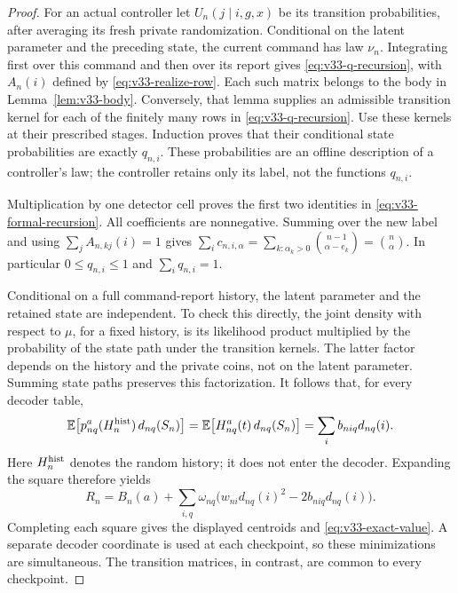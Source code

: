 \begin{proof}
For an actual controller let $U_n(j\mid i,g,x)$ be its transition
probabilities, after averaging its fresh private randomization.
Conditional on the latent parameter and the preceding state, the
current command has law $\nu_n$. Integrating first over this command
and then over its report gives \eqref{eq:v33-q-recursion}, with
$A_n(i)$ defined by \eqref{eq:v33-realize-row}. Each such matrix
belongs to the body in Lemma~\ref{lem:v33-body}.
Conversely, that lemma supplies an admissible transition kernel for
each of the finitely many rows in \eqref{eq:v33-q-recursion}. Use
these kernels at their prescribed stages. Induction proves that their
conditional state probabilities are exactly $q_{n,i}$. These
probabilities are an offline description of a controller's law; the
controller retains only its label, not the functions $q_{n,i}$.

Multiplication by one detector cell proves the first two identities
in \eqref{eq:v33-formal-recursion}. All coefficients are nonnegative.
Summing over the new label and using $\sum_j A_{n,kj}(i)=1$ gives
$\sum_i c_{n,i,\alpha}=\sum_{k:\alpha_k>0}\binom{n-1}{\alpha-e_k}
=\binom n\alpha$. In particular $0\le q_{n,i}\le1$ and
$\sum_i q_{n,i}=1$.

Conditional on a full command-report history, the latent parameter
and the retained state are independent. To check this directly, the
joint density with respect to $\mu$, for a fixed history, is its
likelihood product multiplied by the probability of the state path
under the transition kernels. The latter factor depends on the
history and the private coins, not on the latent parameter. Summing
state paths preserves this factorization. It follows that, for every
decoder table,
\[
 \mathbb E\bigl[p^a_{nq}(H_n^{\rm hist})\,d_{nq}(S_n)\bigr]
       =\mathbb E\bigl[H^a_{nq}(t)\,d_{nq}(S_n)\bigr]
       =\sum_i b_{niq}d_{nq}(i).
\]
Here $H_n^{\rm hist}$ denotes the random history;
it does not enter the decoder. Expanding the square therefore yields
\begin{equation}\label{eq:v33-fixed-decoder}
 R_n=B_n(a)+\sum_{i,q}\omega_{nq}
          \bigl(w_{ni}d_{nq}(i)^2-2b_{niq}d_{nq}(i)\bigr).
\end{equation}
Completing each square gives the displayed centroids and
\eqref{eq:v33-exact-value}. A separate decoder coordinate is used
at each checkpoint, so these minimizations are simultaneous. The
transition matrices, in contrast, are common to every checkpoint.


\end{proof}
